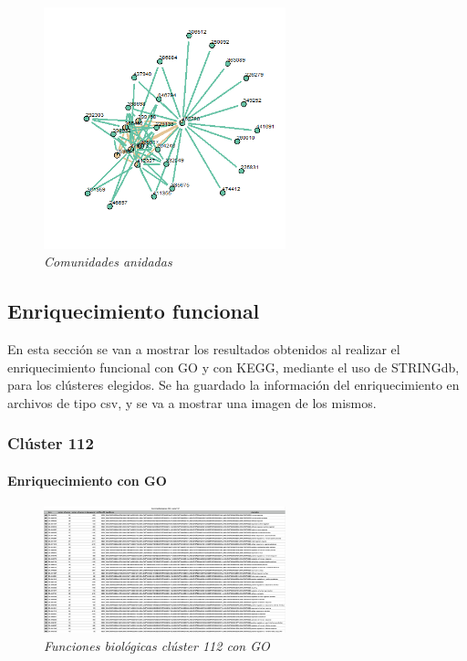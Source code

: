 \begin{figure}[h]
	\centering
	\includegraphics[width=70mm,scale=1.2]{figures/nested_comm.png}
	\caption{\textit{Comunidades anidadas}}
	\label{anidadas}
\end{figure}

\subsection{Enriquecimiento funcional}

En esta sección se van a mostrar los resultados obtenidos al realizar el enriquecimiento funcional con GO y con KEGG, mediante el uso de STRINGdb, para los clústeres elegidos.
Se ha guardado la información del enriquecimiento en archivos de tipo csv, y se va a mostrar una imagen de los mismos.

\subsubsection{Clúster 112}

\paragraph{Enriquecimiento con GO}

\begin{figure}[h]
	\centering
	\includegraphics[width=70mm,scale=1.2]{figures/cluster112_GO.png}
	\caption{\textit{Funciones biológicas clúster 112 con GO}}
	\label{112go}
\end{figure}

